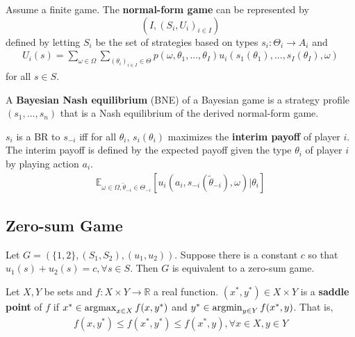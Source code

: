 \documentclass[11pt]{elegantbook}
\newcommand{\argmax}{\operatornamewithlimits{argmax}}
\newcommand{\argmin}{\operatornamewithlimits{argmin}}
\begin{document}
\begin{definition}
    \normalfont
    Assume a finite game. The \textbf{normal-form game} can be represented by $$\left(I,(S_i,U_i)_{i\in I}\right)$$ defined by letting $S_i$ be the set of strategies based on types $s_i:\Theta_i \rightarrow A_i$ and
    \begin{equation}
        \begin{aligned}
            U_i(s)=\sum_{\omega\in\Omega}\sum_{(\theta_i)_{i\in I}\in \Theta}p(\omega,\theta_1,...,\theta_I)u_i(s_1(\theta_1),..., s_I(\theta_I),\omega)
        \end{aligned}
        \nonumber
    \end{equation}
    for all $s\in S$.

    A \textbf{Bayesian Nash equilibrium} (BNE) of a Bayesian game is a strategy profile $(s_1,...,s_n)$ that is a Nash equilibrium of the derived normal-form game.
\end{definition}

\begin{definition}
    \normalfont
    $s_i$ is a BR to $s_{-i}$ iff for all $\theta_i$, $s_i(\theta_i)$ maximizes the \textbf{interim payoff} of player $i$. The interim payoff is defined by the expected payoff given the type $\theta_i$ of player $i$ by playing action $a_i$.
    \begin{equation}
        \begin{aligned}
            \mathbb{E}_{\omega\in\Omega,\tilde{\theta}_{-i}\in\Theta_{-i}}[u_i(a_i,s_{-i}(\tilde{\theta}_{-i}),\omega)|\theta_i]
        \end{aligned}
        \nonumber
    \end{equation}
\end{definition}

\subsection{Zero-sum Game}
Let $G=(\{1,2\},(S_1,S_2),(u_1,u_2))$. Suppose there is a constant $c$ so that $u_1(s)+u_2(s)=c, \forall s\in S$. Then $G$ is equivalent to a zero-sum game.

\begin{definition}
    \normalfont
    Let $X,Y$ be sets and $f:X\times Y \rightarrow \mathbb{R}$ a real function. $(x^*,y^*)\in X\times Y$ is a \textbf{saddle point} of $f$ if $x^*\in\argmax_{x\in X}f(x,y^*)$ and $y^*\in\argmin_{y\in Y}f(x^*,y)$. That is,
    \begin{equation}
        \begin{aligned}
            f(x,y^*)\leq f(x^*,y^*)\leq f(x^*,y),\forall x\in X,y\in Y
        \end{aligned}
        \nonumber
    \end{equation}
\end{definition}
\end{document}
